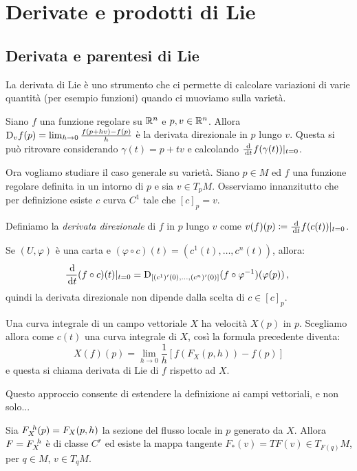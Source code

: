 \chapter{Derivate e prodotti di Lie}

\section{Derivata e parentesi di Lie}
La derivata di Lie è uno strumento che ci permette di calcolare variazioni di varie quantità (per esempio funzioni) quando ci muoviamo sulla varietà.

Siano $f$ una funzione regolare su $\mathbb R^n$ e $p,v\in\mathbb R^n$. Allora $\mathrm D_vf(p)=\lim_{h\to 0} \frac{f(p+hv)-f(p)}h$ è la derivata direzionale in $p$ lungo $v$. Questa si può ritrovare considerando $\gamma(t)=p+tv$ e calcolando $\frac {\,\mathrm d}{\,\mathrm d t} f(\gamma(t))|_{t=0}$.

Ora vogliamo studiare il caso generale su varietà.
Siano $p\in M$ ed $f$ una funzione regolare definita in un intorno di $p$ e sia $v \in T_{p}M$. Osserviamo innanzitutto che per definizione esiste $c$ curva $C^1$ tale che $[c]_p=v$.

\begin{definition} 
	Definiamo la \emph{derivata direzionale} di $f$ in $p$ lungo $v$ come $v(f)(p)\coloneqq\frac {\,\mathrm d} {\,\mathrm d t} f(c(t))|_{t=0}$.
\end{definition}

Se $(U,\varphi)$ è una carta e $(\varphi\circ c)(t)=(c^1(t),\ldots,c^n(t))$, allora:
\begin{equation*}
	\frac {\,\mathrm d}{\,\mathrm d t} (f\circ c)(t)|_{t=0}=\mathrm D_{[(c^1)'(0),\ldots,(c^n)'(0)]}(f\circ\varphi^{-1})(\varphi(p)) \, \text{, }
\end{equation*}
quindi la derivata direzionale non dipende dalla scelta di $c\in[c]_p$.

Una curva integrale di un campo vettoriale $X$ ha velocità $X(p)$ in $p$. Scegliamo allora come $c(t)$ una curva integrale di $X$, così la formula precedente diventa:
\begin{equation*}
	X(f)(p)=\lim_{h\to 0} \frac 1h \left[ f(F_X(p,h))-f(p) \right] %
\end{equation*}
e questa si chiama derivata di Lie di $f$ rispetto ad $X$.

Questo approccio consente di estendere la definizione ai campi vettoriali, e non solo...

Sia $F_{X}^{\ h}(p)=F_X(p,h)$ la sezione del flusso locale in $p$ generato da $X$. Allora $F=F_{X}^{\ h}$ è di classe $C^r$ ed esiste la mappa tangente $F_*(v)=TF(v)\in T_{F(q)}M$, per $q\in M$, $v\in T_qM$.

